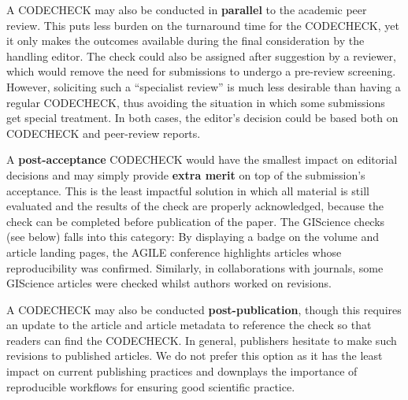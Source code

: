 \documentclass[12pt]{article}
\begin{document}
A CODECHECK may also be conducted in \textbf{parallel} to the academic
peer review.  This puts less burden on the turnaround time for the
CODECHECK, yet it only makes the outcomes available during the final
consideration by the handling editor.  The check could also be
assigned after suggestion by a reviewer, which would remove the need
for submissions to undergo a pre-review screening.  However,
soliciting such a ``specialist review'' is much less desirable than
having a regular CODECHECK, thus avoiding the situation in which some
submissions get special treatment. In both cases, the editor's
decision could be based both on CODECHECK and peer-review reports.

A \textbf{post-acceptance} CODECHECK would have the smallest impact on
editorial decisions and may simply provide \textbf{extra merit} on top
of the submission's acceptance.  This is the least impactful solution
in which all material is still evaluated and the results of the check
are properly acknowledged, because the check can be completed before
publication of the paper.  The GIScience checks (see
below) falls into this category: By displaying a badge on the volume
and article landing pages, the AGILE conference highlights articles
whose reproducibility was confirmed.  Similarly, in
collaborations with journals, some GIScience articles were
checked whilst authors worked on revisions.

A CODECHECK may also be conducted \textbf{post-publication}, though
this requires an update to the article and article metadata to
reference the check so that readers can find the CODECHECK.  In
general, publishers hesitate to make such revisions to published
articles.  We do not prefer this option as it has the least impact on
current publishing practices and downplays the importance
of reproducible workflows for ensuring good scientific practice.
\end{document}
